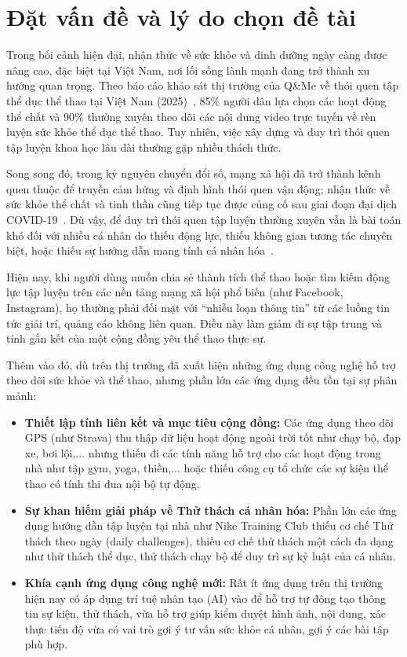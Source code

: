 \label{chap:intro}

\section{Đặt vấn đề và lý do chọn đề tài}
\label{sec:intro:motivation}

Trong bối cảnh hiện đại, nhận thức về sức khỏe và dinh dưỡng ngày càng được nâng cao, đặc biệt tại Việt Nam, nơi lối sống lành mạnh đang trở thành xu hướng quan trọng. Theo báo cáo khảo sát thị trường của Q\&Me về thói quen tập thể dục thể thao tại Việt Nam (2025)~\cite{QAndMeVN}, 85\% người dân lựa chọn các hoạt động thể chất và 90\% thường xuyên theo dõi các nội dung video trực tuyến về rèn luyện sức khỏe thể dục thể thao. Tuy nhiên, việc xây dựng và duy trì thói quen tập luyện khoa học lâu dài thường gặp nhiều thách thức.

Song song đó, trong kỷ nguyên chuyển đổi số, mạng xã hội đã trở thành kênh quen thuộc để truyền cảm hứng và định hình thói quen vận động; nhận thức về sức khỏe thể chất và tinh thần cũng tiếp tục được củng cố sau giai đoạn đại dịch COVID-19~\cite{WHO_COVID19}. Dù vậy, để duy trì thói quen tập luyện thường xuyên vẫn là bài toán khó đối với nhiều cá nhân do thiếu động lực, thiếu không gian tương tác chuyên biệt, hoặc thiếu sự hướng dẫn mang tính cá nhân hóa~\cite{WHO_PhysicalActivity}.

Hiện nay, khi người dùng muốn chia sẻ thành tích thể thao hoặc tìm kiếm động lực tập luyện trên các nền tảng mạng xã hội phổ biến (như Facebook, Instagram), họ thường phải đối mặt với ``nhiễu loạn thông tin'' từ các luồng tin tức giải trí, quảng cáo không liên quan. Điều này làm giảm đi sự tập trung và tính gắn kết của một cộng đồng yêu thể thao thực sự.

Thêm vào đó, dù trên thị trường đã xuất hiện những ứng dụng công nghệ hỗ trợ theo dõi sức khỏe và thể thao, nhưng phần lớn các ứng dụng đều tồn tại sự phân mảnh:

\begin{itemize}
    \item \textbf{Thiết lập tính liên kết và mục tiêu cộng đồng:} Các ứng dụng theo dõi GPS (như Strava) thu thập dữ liệu hoạt động ngoài trời tốt như chạy bộ, đạp xe, bơi lội,... nhưng thiếu đi các tính năng hỗ trợ cho các hoạt động trong nhà như tập gym, yoga, thiền,... hoặc thiếu công cụ tổ chức các sự kiện thể thao có tính thi đua nội bộ tự động.
    \item \textbf{Sự khan hiếm giải pháp về Thử thách cá nhân hóa:} Phần lớn các ứng dụng hướng dẫn tập luyện tại nhà như Nike Training Club thiếu cơ chế Thử thách theo ngày (daily challenges), thiếu cơ chế thử thách một cách đa dạng như thử thách thể dục, thử thách chạy bộ để duy trì sự kỷ luật của cá nhân.
    \item \textbf{Khía cạnh ứng dụng công nghệ mới:} Rất ít ứng dụng trên thị trường hiện nay có áp dụng trí tuệ nhân tạo (AI) vào để hỗ trợ tự động tạo thông tin sự kiện, thử thách, vừa hỗ trợ giúp kiểm duyệt hình ảnh, nội dung, xác thực tiến độ vừa có vai trò gợi ý tư vấn sức khỏe cá nhân, gợi ý các bài tập phù hợp.
\end{itemize}

